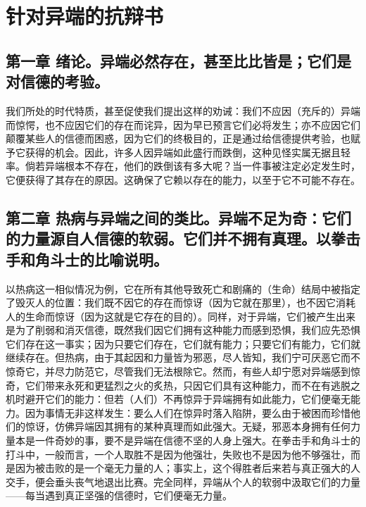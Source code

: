 
\chapter{针对异端的抗辩书}



\section{第一章 绪论。异端必然存在，甚至比比皆是；它们是对信德的考验。}

我们所处的时代特质，甚至促使我们提出这样的劝诫：我们不应因（充斥的）异端而惊愕，也不应因它们的存在而诧异，因为早已预言它们必将发生；亦不应因它们颠覆某些人的信德而困惑，因为它们的终极目的，正是通过给信德提供考验，也赋予它获得的机会。因此，许多人因异端如此盛行而跌倒，这种见怪实属无据且轻率。倘若异端根本不存在，他们的跌倒该有多大呢？当一件事被注定必定发生时，它便获得了其存在的原因。这确保了它赖以存在的能力，以至于它不可能不存在。\par


\section{第二章 热病与异端之间的类比。异端不足为奇：它们的力量源自人信德的软弱。它们并不拥有真理。以拳击手和角斗士的比喻说明。}

以热病这一相似情况为例，它在所有其他导致死亡和剧痛的（生命）结局中被指定了毁灭人的位置：我们既不因它的存在而惊讶（因为它就在那里），也不因它消耗人的生命而惊讶（因为这就是它存在的目的）。同样，对于异端，它们被产生出来是为了削弱和消灭信德，既然我们因它们拥有这种能力而感到恐惧，我们应先恐惧它们存在这一事实；因为只要它们存在，它们就有能力；只要它们有能力，它们就继续存在。但热病，由于其起因和力量皆为邪恶，尽人皆知，我们宁可厌恶它而不惊奇它，并尽力防范它，尽管我们无法根除它。然而，有些人却宁愿对异端感到惊奇，它们带来永死和更猛烈之火的炙热，只因它们具有这种能力，而不在有逃脱之机时避开它们的能力：但若（人们）不再惊异于异端拥有如此能力，它们便毫无能力。因为事情无非这样发生：要么人们在惊异时落入陷阱，要么由于被困而珍惜他们的惊讶，仿佛异端因其拥有的某种真理而如此强大。无疑，邪恶本身拥有任何力量本是一件奇妙的事，要不是异端在信德不坚的人身上强大。在拳击手和角斗士的打斗中，一般而言，一个人取胜不是因为他强壮，失败也不是因为他不够强壮，而是因为被击败的是一个毫无力量的人；事实上，这个得胜者后来若与真正强大的人交手，便会垂头丧气地退出比赛。完全同样，异端从个人的软弱中汲取它们的力量——每当遇到真正坚强的信德时，它们便毫无力量。\par

